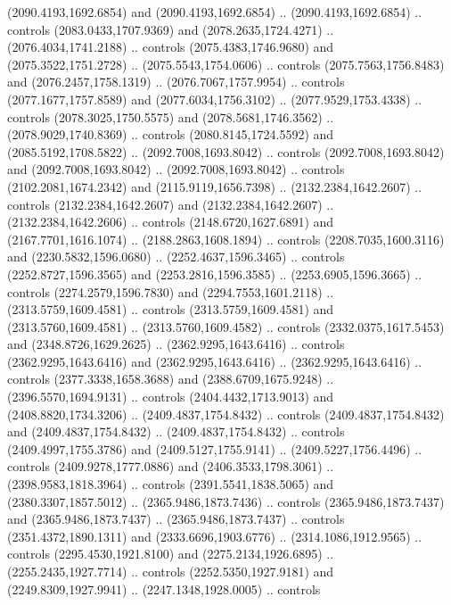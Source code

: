 \begin{scope}[shift={(19.44451,-318.97965)}]
\begin{scope}[shift={(-2093.8013,-1176.4989)}]
\begin{scope}
\begin{scope}
          (2090.4193,1692.6854) and (2090.4193,1692.6854) .. (2090.4193,1692.6854) ..
          controls (2083.0433,1707.9369) and (2078.2635,1724.4271) ..
          (2076.4034,1741.2188) .. controls (2075.4383,1746.9680) and
          (2075.3522,1751.2728) .. (2075.5543,1754.0606) .. controls
          (2075.7563,1756.8483) and (2076.2457,1758.1319) .. (2076.7067,1757.9954) ..
          controls (2077.1677,1757.8589) and (2077.6034,1756.3102) ..
          (2077.9529,1753.4338) .. controls (2078.3025,1750.5575) and
          (2078.5681,1746.3562) .. (2078.9029,1740.8369) .. controls
          (2080.8145,1724.5592) and (2085.5192,1708.5822) .. (2092.7008,1693.8042) ..
          controls (2092.7008,1693.8042) and (2092.7008,1693.8042) ..
          (2092.7008,1693.8042) .. controls (2102.2081,1674.2342) and
          (2115.9119,1656.7398) .. (2132.2384,1642.2607) .. controls
          (2132.2384,1642.2607) and (2132.2384,1642.2607) .. (2132.2384,1642.2606) ..
          controls (2148.6720,1627.6891) and (2167.7701,1616.1074) ..
          (2188.2863,1608.1894) .. controls (2208.7035,1600.3116) and
          (2230.5832,1596.0680) .. (2252.4637,1596.3465) .. controls
          (2252.8727,1596.3565) and (2253.2816,1596.3585) .. (2253.6905,1596.3665) ..
          controls (2274.2579,1596.7830) and (2294.7553,1601.2118) ..
          (2313.5759,1609.4581) .. controls (2313.5759,1609.4581) and
          (2313.5760,1609.4581) .. (2313.5760,1609.4582) .. controls
          (2332.0375,1617.5453) and (2348.8726,1629.2625) .. (2362.9295,1643.6416) ..
          controls (2362.9295,1643.6416) and (2362.9295,1643.6416) ..
          (2362.9295,1643.6416) .. controls (2377.3338,1658.3688) and
          (2388.6709,1675.9248) .. (2396.5570,1694.9131) .. controls
          (2404.4432,1713.9013) and (2408.8820,1734.3206) .. (2409.4837,1754.8432) ..
          controls (2409.4837,1754.8432) and (2409.4837,1754.8432) ..
          (2409.4837,1754.8432) .. controls (2409.4997,1755.3786) and
          (2409.5127,1755.9141) .. (2409.5227,1756.4496) .. controls
          (2409.9278,1777.0886) and (2406.3533,1798.3061) .. (2398.9583,1818.3964) ..
          controls (2391.5541,1838.5065) and (2380.3307,1857.5012) ..
          (2365.9486,1873.7436) .. controls (2365.9486,1873.7437) and
          (2365.9486,1873.7437) .. (2365.9486,1873.7437) .. controls
          (2351.4372,1890.1311) and (2333.6696,1903.6776) .. (2314.1086,1912.9565) ..
          controls (2295.4530,1921.8100) and (2275.2134,1926.6895) ..
          (2255.2435,1927.7714) .. controls (2252.5350,1927.9181) and
          (2249.8309,1927.9941) .. (2247.1348,1928.0005) .. controls

\end{scope}
\end{scope}
\end{scope}
\end{scope}
